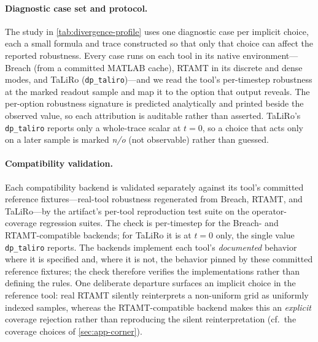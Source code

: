 \paragraph{Diagnostic case set and protocol.}
The study in \cref{tab:divergence-profile} uses one diagnostic case per
implicit choice, each a small formula and trace constructed so that only that
choice can affect the reported robustness. Every case runs on each tool in its
native environment---Breach (from a committed MATLAB cache), RTAMT in its
discrete and dense modes, and TaLiRo (\texttt{dp\_taliro})---and we read the
tool's per-timestep robustness at the marked readout sample and map it to the
option that output reveals. The per-option robustness signature is predicted
analytically and printed beside the observed value, so each attribution is
auditable rather than asserted. TaLiRo's \texttt{dp\_taliro} reports only a
whole-trace scalar at $t=0$, so a choice that acts only on a later sample is
marked \emph{n/o} (not observable) rather than guessed.

\paragraph{Compatibility validation.}
Each \tool compatibility backend is validated separately against its tool's
committed reference fixtures---real-tool robustness regenerated from Breach,
RTAMT, and TaLiRo---by the artifact's per-tool reproduction
test suite on the operator-coverage regression suites. The check is per-timestep
for the Breach- and RTAMT-compatible backends;
for TaLiRo it is at $t=0$ only, the single value \texttt{dp\_taliro} reports.
The backends implement each tool's \emph{documented} behavior where it is
specified and, where it is not, the behavior pinned by these committed
reference fixtures; the check therefore verifies the implementations rather than
defining the rules. One deliberate departure surfaces an implicit choice in the
reference tool: real RTAMT silently reinterprets a non-uniform grid as uniformly
indexed samples, whereas the RTAMT-compatible backend makes this an
\emph{explicit} coverage
rejection rather than reproducing the silent reinterpretation (cf.\ the
coverage choices of \cref{sec:app-corner}).

